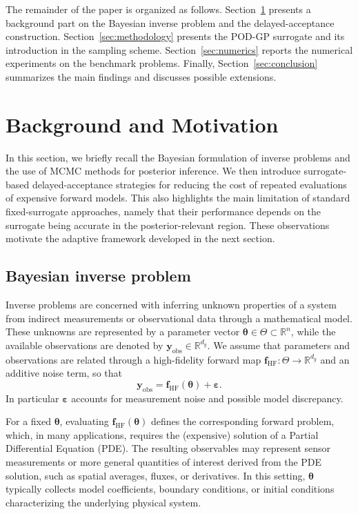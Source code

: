 \documentclass{elsarticle}
\begin{document}
The remainder of the paper is organized as follows. Section~\ref{sec:background} presents a background part on the Bayesian inverse problem and the delayed-acceptance construction.
Section~\ref{sec:methodology} presents the
POD-GP surrogate and its introduction in the sampling scheme. Section~\ref{sec:numerics} reports the numerical experiments on the benchmark problems.
Finally, Section~\ref{sec:conclusion} summarizes the
main findings and discusses possible extensions.

\section{Background and Motivation}
\label{sec:background}

In this section, we briefly recall the Bayesian formulation of inverse problems and the use of MCMC methods for posterior inference. We then introduce surrogate-based delayed-acceptance strategies for reducing the cost of repeated evaluations of expensive forward models. This also highlights the main limitation of standard fixed-surrogate approaches, namely that their performance depends on the surrogate being accurate in the posterior-relevant region. These observations motivate the adaptive framework developed in the next section.

\subsection{Bayesian inverse problem}
\label{sec:bayesian-background}

Inverse problems are concerned with inferring unknown properties of a system from indirect measurements or observational data through a mathematical model. These unknowns are represented by a parameter vector $\boldsymbol{\theta}\in\Theta\subset\mathbb R^n$, while the available observations are denoted by $\mathbf y_{\mathrm{obs}}\in\mathbb R^{d_y}$. We assume that parameters and observations are related through a high-fidelity forward map $\mathbf f_{\mathrm{HF}}:\Theta\to\mathbb R^{d_y}$ and an additive noise term, so that
\begin{equation}\label{eq:hf}
   \mathbf y_{\mathrm{obs}} = \mathbf f_{\mathrm{HF}}(\boldsymbol{\theta}) + \boldsymbol{\varepsilon}.
\end{equation}
In particular $\boldsymbol{\varepsilon}$ accounts for measurement noise and possible model discrepancy.

For a fixed $\boldsymbol{\theta}$, evaluating $\mathbf f_{\mathrm{HF}}(\boldsymbol{\theta})$ defines the corresponding forward problem, which, in many applications, requires the (expensive) solution of a Partial Differential Equation (PDE). The resulting observables may represent sensor measurements or more general quantities of interest derived from the PDE solution, such as spatial averages, fluxes, or derivatives. In this setting, $\boldsymbol{\theta}$ typically collects model coefficients, boundary conditions, or initial conditions characterizing the underlying physical system.
\end{document}
